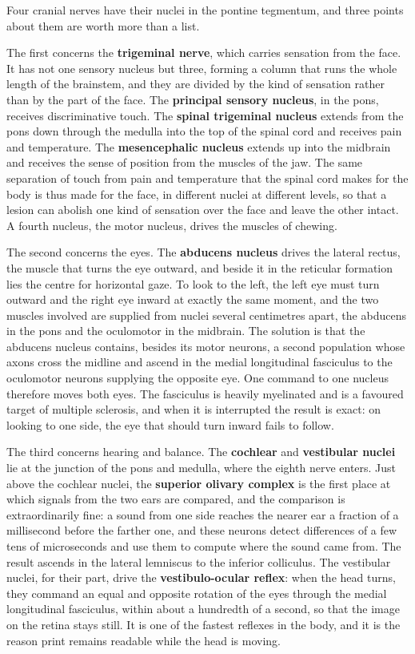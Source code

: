 \documentclass[11pt]{article}
\begin{document}
Four cranial nerves have their nuclei in the pontine tegmentum, and three points about them are worth more than a list.

The first concerns the \textbf{trigeminal nerve}, which carries sensation from the face. It has not one sensory nucleus but three, forming a column that runs the whole length of the brainstem, and they are divided by the kind of sensation rather than by the part of the face. The \textbf{principal sensory nucleus}, in the pons, receives discriminative touch. The \textbf{spinal trigeminal nucleus} extends from the pons down through the medulla into the top of the spinal cord and receives pain and temperature. The \textbf{mesencephalic nucleus} extends up into the midbrain and receives the sense of position from the muscles of the jaw. The same separation of touch from pain and temperature that the spinal cord makes for the body is thus made for the face, in different nuclei at different levels, so that a lesion can abolish one kind of sensation over the face and leave the other intact. A fourth nucleus, the motor nucleus, drives the muscles of chewing.

The second concerns the eyes. The \textbf{abducens nucleus} drives the lateral rectus, the muscle that turns the eye outward, and beside it in the reticular formation lies the centre for horizontal gaze. To look to the left, the left eye must turn outward and the right eye inward at exactly the same moment, and the two muscles involved are supplied from nuclei several centimetres apart, the abducens in the pons and the oculomotor in the midbrain. The solution is that the abducens nucleus contains, besides its motor neurons, a second population whose axons cross the midline and ascend in the medial longitudinal fasciculus to the oculomotor neurons supplying the opposite eye. One command to one nucleus therefore moves both eyes. The fasciculus is heavily myelinated and is a favoured target of multiple sclerosis, and when it is interrupted the result is exact: on looking to one side, the eye that should turn inward fails to follow.

The third concerns hearing and balance. The \textbf{cochlear} and \textbf{vestibular nuclei} lie at the junction of the pons and medulla, where the eighth nerve enters. Just above the cochlear nuclei, the \textbf{superior olivary complex} is the first place at which signals from the two ears are compared, and the comparison is extraordinarily fine: a sound from one side reaches the nearer ear a fraction of a millisecond before the farther one, and these neurons detect differences of a few tens of microseconds and use them to compute where the sound came from. The result ascends in the lateral lemniscus to the inferior colliculus. The vestibular nuclei, for their part, drive the \textbf{vestibulo-ocular reflex}: when the head turns, they command an equal and opposite rotation of the eyes through the medial longitudinal fasciculus, within about a hundredth of a second, so that the image on the retina stays still. It is one of the fastest reflexes in the body, and it is the reason print remains readable while the head is moving.
\end{document}
